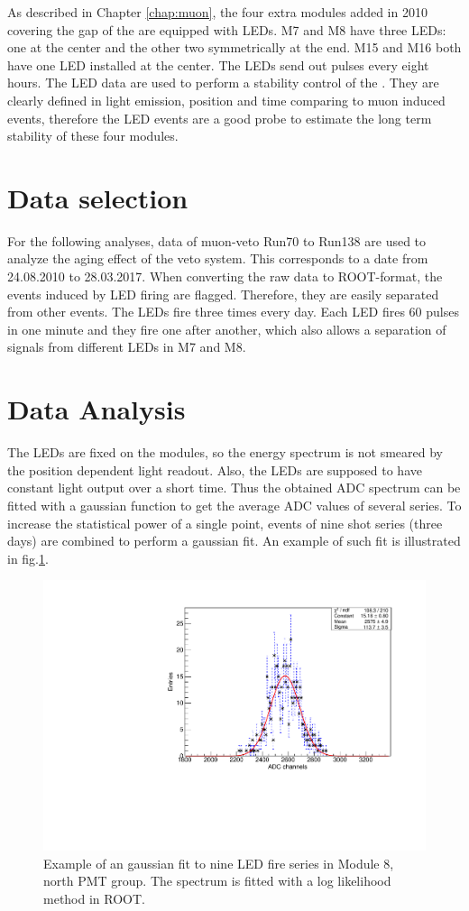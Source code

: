 As described in Chapter \ref{chap:muon}, the four extra modules added in 2010 covering the gap of the \mvs are equipped with LEDs. M7 and M8 have three LEDs: one at the center and the other two symmetrically at the end. M15 and M16 both have one LED installed at the center. The LEDs send out pulses every eight hours. The LED data are used to perform a stability control of the \mvs. They are clearly defined in light emission, position and time comparing to muon induced events, therefore the LED events are a good probe to estimate the long term stability of these four modules.
\section{Data selection}
For the following analyses, data of muon-veto Run70 to Run138 are used to analyze the aging effect of the veto system. This corresponds to a date from 24.08.2010 to 28.03.2017. When converting the raw data to ROOT-format, the events induced by LED firing are flagged. Therefore, they are easily separated from other events.
The LEDs fire three times every day. Each LED fires 60 pulses in one minute and they fire one after another, which also allows a separation of signals from different LEDs in M7 and M8.



\section{Data Analysis}
The LEDs are fixed on the modules, so the energy spectrum is not smeared by the position dependent light readout. Also, the LEDs are supposed to have constant light output over a short time. Thus the obtained ADC spectrum can be fitted with a gaussian function to get the average ADC values of several series.
To increase the statistical power of a single point, events of nine shot series (three days) are combined to perform a gaussian fit. An example of such fit is illustrated in fig.\ref{fig:gaussian-fit}.

\begin{figure}[htb!]
  \centering
  \includegraphics[width=0.5\textwidth{}]{./fig/gaussianM8.pdf}
  \caption{Example of an gaussian fit to nine LED fire series in Module 8, north PMT group. The spectrum is fitted with a log likelihood method in ROOT.}
  \label{fig:gaussian-fit}
\end{figure}

